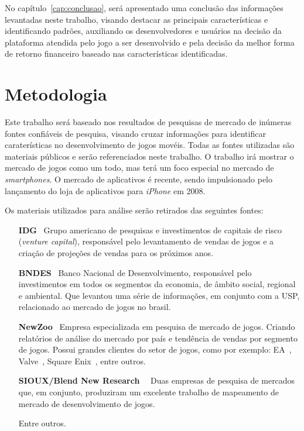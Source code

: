 No capítulo~\ref{cap:conclusao}, será apresentado uma conclusão das informações levantadas neste trabalho, visando destacar as principais características e identificando padrões, auxiliando os desenvolvedores e usuários na decisão da plataforma atendida pelo jogo a ser desenvolvido e pela decisão da melhor forma de retorno financeiro baseado nas características identificadas.



\section{Metodologia}

Este trabalho será baseado nos resultados de pesquisas de mercado de inúmeras fontes confiáveis de pesquisa, visando cruzar informações para identificar caraterísticas no desenvolvimento de jogos movéis. Todas as fontes utilizadas são materiais públicos e serão referenciados neste trabalho.\newline
O trabalho irá mostrar o mercado de jogos como um todo, mas terá um foco especial no mercado de \emph{smartphones}. O mercado de aplicativos é recente, sendo impulsionado pelo lançamento do loja de aplicativos para \emph{iPhone} em 2008.



Os materiais utilizados para análise serão retirados das seguintes fontes:


\begin{itemize}

	\item [\textbf{IDG}~\cite{idg}] Grupo americano de pesquisas e investimentos de capitais de risco (\emph{venture capital}), responsável pelo levantamento de vendas de jogos e a criação de projeções de vendas para os próximos anos.

	\item [\textbf{BNDES}~\cite{bndes}] Banco Nacional de Desenvolvimento, responsável pelo investimentos em todos os segmentos da economia, de âmbito social, regional e ambiental. Que levantou uma série de informações, em conjunto com a USP, relacionado ao mercado de jogos no brasil.
	
	\item [\textbf{NewZoo}~\cite{newzoo}] Empresa especializada em pesquisa de mercado de jogos. Criando relatórios de análise do mercado por país e tendência de vendas por segmento de jogos. Possui grandes clientes do setor de jogos, como por exemplo: EA~\cite{ea}, Valve~\cite{valve}, Square Enix~\cite{square-enix}, entre outros.
	
	
	\item[\textbf{SIOUX/Blend New Research}~\cite{sioux}~\cite{blend}] Duas empresas de pesquisa de mercados que, em conjunto, produziram um excelente trabalho de mapeamento de mercado de desenvolvimento de jogos.
	
	\item [Entre outros.]

\end{itemize}





